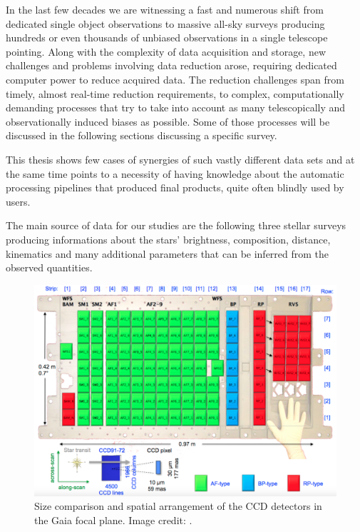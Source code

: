 In the last few decades we are witnessing a fast and numerous shift from dedicated single object observations to massive all-sky surveys producing hundreds or even thousands of unbiased observations in a single telescope pointing. Along with the complexity of data acquisition and storage, new challenges and problems involving data reduction arose, requiring dedicated computer power to reduce acquired data. The reduction challenges span from timely, almost real-time reduction requirements, to complex, computationally demanding processes that try to take into account as many telescopically and observationally induced biases as possible. Some of those processes will be discussed in the following sections discussing a specific survey.

This thesis shows few cases of synergies of such vastly different data sets and at the same time points to a necessity of having knowledge about the automatic processing pipelines that produced final products, quite often blindly used by users.

The main source of data for our studies are the following three stellar surveys producing informations about the stars' brightness, composition, distance, kinematics and many additional parameters that can be inferred from the observed quantities.

\begin{figure}
	\centering
	\includegraphics[width=\columnwidth]{gaia_ccd.png}
	\caption{Size comparison and spatial arrangement of the CCD detectors in the Gaia focal plane. Image credit: \citet{2016A&A...595A...1G}.}
	\label{fig:gaia_ccd}
\end{figure}


